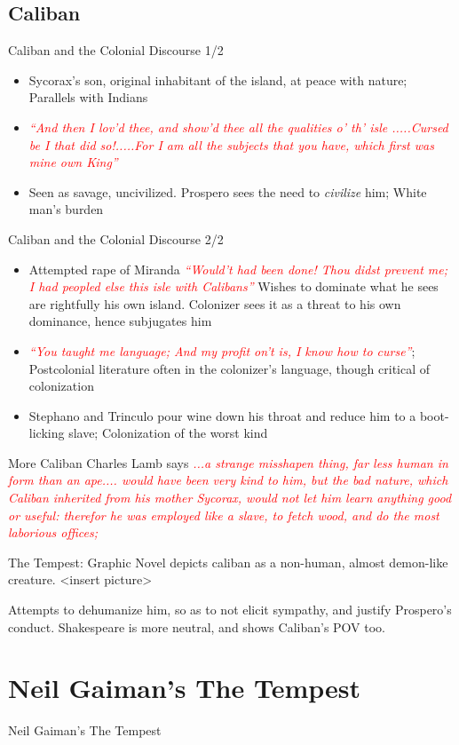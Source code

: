 \documentclass{beamer}
\begin{document}
\subsection{Caliban}
  \begin{frame}{Caliban and the Colonial Discourse 1/2}
    \begin{itemize}
    \item Sycorax's son, original inhabitant of the island, at peace with nature; Parallels with Indians
    \item \textcolor{red}{\emph{``And then I lov'd thee, and show'd thee all the qualities o' th' isle .....Cursed be I that did so!.....For I am all the subjects that you have, which first was mine own King''}}
    \item Seen as savage, uncivilized. Prospero sees the need to \emph{civilize} him; White man's burden
    \end{itemize}
  \end{frame}
  \begin{frame}{Caliban and the Colonial Discourse 2/2}
    \begin{itemize}
    \item Attempted rape of Miranda \textcolor{red}{\emph{``Would't had been done! Thou didst prevent me; I had peopled else this isle with Calibans''}} Wishes to dominate what he sees are rightfully his own island. Colonizer sees it as a threat to his own dominance, hence subjugates him
    \item \textcolor{red}{\emph{``You taught me language; And my profit on't is, I know how to curse''}}; Postcolonial literature often in the colonizer's language, though critical of colonization
    \item Stephano and Trinculo pour wine down his throat and reduce him to a boot-licking slave; Colonization of the worst kind
    \end{itemize}
  \end{frame}

  \begin{frame}{More Caliban}
      Charles Lamb says \textcolor{red}{\emph{...a strange misshapen thing, far less human in form than an ape.... would have been very kind to him, but the bad nature, which Caliban inherited from his mother Sycorax, would not let him learn anything good or useful: therefor he was employed like a slave, to fetch wood, and do the most laborious offices;}}

        The Tempest: Graphic Novel depicts caliban as a non-human, almost demon-like creature. <insert picture>

        Attempts to dehumanize him, so as to not elicit sympathy, and justify Prospero's conduct. Shakespeare is more neutral, and shows Caliban's POV too.
  \end{frame}

  \section{Neil Gaiman's The Tempest}
  \begin{frame}{Neil Gaiman's The Tempest}
    \begin{itemize}
      
    \end{itemize}
  \end{frame}
  
  
\end{document}
